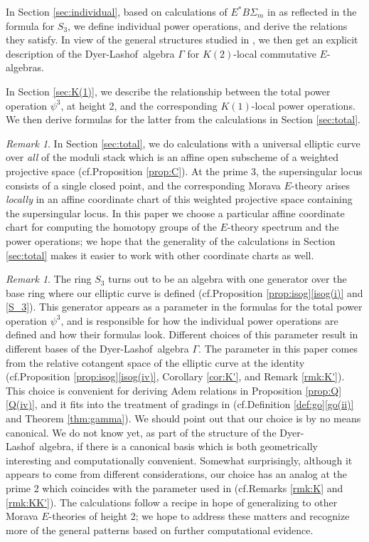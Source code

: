 \documentclass{gtpart}
\theoremstyle{definition}
\theoremstyle{remark}
\newtheorem{rmk}[thm]{Remark}
\newcommand{\cf}{cf.\thinspace}
\newcommand{\DL}{Dyer-Lashof~}
\newcommand{\G}{\Gamma}
\newcommand{\p}{\psi^3}
\newcommand{\isog}[1]{Proposition \ref{prop:isog}\thinspace \eqref{isog(#1)}}
\newcommand{\q}[1]{Proposition \ref{prop:Q}\thinspace \eqref{Q(#1)}}
\newcommand{\go}[1]{Definition \ref{def:go}\thinspace \eqref{go(#1)}}
\begin{document}
In Section \ref{sec:individual}, based on calculations of $E^* B\Sigma_m$ in \cite{Str98} as reflected in the formula for $S_3$, 
we define individual power operations, and derive the relations they satisfy.  
In view of the general structures studied in \cite{cong}, 
we then get an explicit description of the \DL algebra $\G$ for $K(2)$-local commutative $E$-algebras.  

In Section \ref{sec:K(1)}, we describe the relationship between the total power operation $\p$, at height 2, and the corresponding $K(1)$-local power operations.  
We then derive formulas for the latter from the calculations in Section \ref{sec:total}.  

\begin{rmk}
\label{rmk:grading}
 In Section \ref{sec:total}, we do calculations with a universal elliptic curve 
 over {\em all} of the moduli stack which is an affine open subscheme 
 of a weighted projective space (\cf Proposition \ref{prop:C}).  
 At the prime 3, the supersingular locus consists of a single closed point, 
 and the corresponding Morava $E$-theory arises {\em locally} 
 in an affine coordinate chart of this weighted projective space containing the supersingular locus.  
 In this paper we choose a particular affine coordinate chart 
 for computing the homotopy groups of the $E$-theory spectrum and the power operations; 
 we hope that the generality of the calculations in Section \ref{sec:total} 
 makes it easier to work with other coordinate charts as well.  
\end{rmk}

\begin{rmk}
\label{rmk:parameter}
 The ring $S_3$ turns out to be an algebra with one generator over the base ring where our elliptic curve is defined 
 (\cf \isog{i} and \eqref{S_3}).  This generator appears as a parameter in the formulas for the total power operation $\p$, 
 and is responsible for how the individual power operations are defined and how their formulas look.  
 Different choices of this parameter result in different bases of the \DL algebra $\G$.  
 The parameter in this paper comes from the relative cotangent space of the elliptic curve at the identity 
 (\cf \isog{iv}, Corollary \ref{cor:K'}, and Remark \ref{rmk:K'}).  
 This choice is convenient for deriving Adem relations in \q{iv}, 
 and it fits into the treatment of gradings in \cite[Section 2]{cong} (\cf \go{ii} and Theorem \ref{thm:gamma}).  
 We should point out that our choice is by no means canonical.  
 We do not know yet, as part of the structure of the \DL algebra, 
 if there is a canonical basis which is both geometrically interesting and computationally convenient.  
 Somewhat surprisingly, although it appears to come from different considerations, 
 our choice has an analog at the prime 2 which coincides with the parameter used in \cite{h2p2} (\cf Remarks \ref{rmk:K} and \ref{rmk:KK'}).  
 The calculations follow a recipe in hope of generalizing to other Morava $E$-theories of height 2; 
 we hope to address these matters and recognize more of the general patterns based on further computational evidence.  
\end{rmk}
\end{document}
